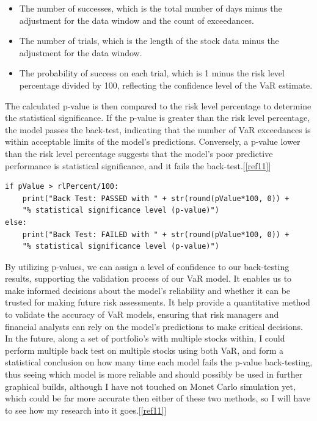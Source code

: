 \documentclass{article}
\begin{document}
\begin{itemize}
    \item The number of successes, which is the total number of days minus the adjustment for the data window and the count of exceedances.
    \item The number of trials, which is the length of the stock data minus the adjustment for the data window.
    \item The probability of success on each trial, which is 1 minus the risk level percentage divided by 100, reflecting the confidence level of the VaR estimate.
\end{itemize}

The calculated p-value is then compared to the risk level percentage to determine the statistical significance. If the p-value is greater than the risk level percentage, the model passes the back-test, indicating that the number of VaR exceedances is within acceptable limits of the model's predictions. Conversely, a p-value lower than the risk level percentage suggests that the model's poor predictive performance is statistical significance, and it fails the back-test.[\ref{ref11}]

\begin{verbatim}
if pValue > rlPercent/100:
    print("Back Test: PASSED with " + str(round(pValue*100, 0)) + 
    "% statistical significance level (p-value)")
else:
    print("Back Test: FAILED with " + str(round(pValue*100, 0)) + 
    "% statistical significance level (p-value)")
\end{verbatim}

By utilizing p-values, we can assign a level of confidence to our back-testing results, supporting the validation process of our VaR model. It enables us to make informed decisions about the model's reliability and whether it can be trusted for making future risk assessments. It help provide a quantitative method to validate the accuracy of VaR models, ensuring that risk managers and financial analysts can rely on the model's predictions to make critical decisions. In the future, along a set of portfolio's with multiple stocks within, I could perform multiple back test on multiple stocks using both VaR, and form a statistical conclusion on how many time each model fails the p-value back-testing, thus seeing which model is more reliable and should possibly be used in further graphical builds, although I have not touched on Monet Carlo simulation yet, which could be far more accurate then either of these two methods, so I will have to see how my research into it goes.[\ref{ref11}]
\end{document}
